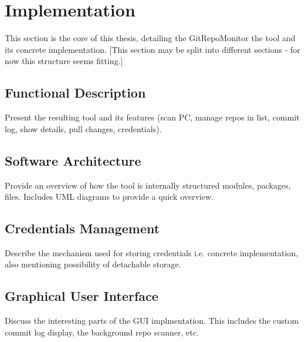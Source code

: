 \section{Implementation}\label{implementation}

This section is the core of this thesis, detailing the GitRepoMonitor the tool and its concrete implementation.
{[This section may be split into different sections - for now this structure seems fitting.]}

\subsection{Functional Description}\label{implementation_overview}

Present the resulting tool and its features {(scan PC, manage repos in list, commit log, show details, pull changes, credentials)}.

\subsection{Software Architecture}\label{implementation_architecture}

Provide an overview of how the tool is internally structured modules, packages, files.
Includes UML diagrams to provide a quick overview.

\subsection{Credentials Management}\label{implementation_credentials}

Describe the mechanism used for storing credentials i.e. concrete implementation, also mentioning possibility of detachable storage.

\subsection{Graphical User Interface}\label{implementation_gui}

Discuss the interesting parts of the GUI implmentation. 
This includes the custom commit log display, the background repo scanner, etc.

